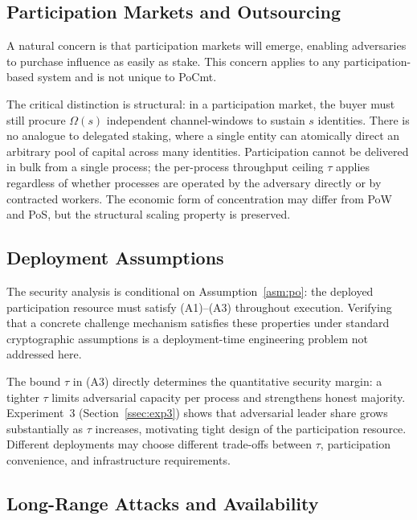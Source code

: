 \documentclass[10pt,journal,twoside]{IEEEtran}
\theoremstyle{remark}
\begin{document}
	\subsection{Participation Markets and Outsourcing}
	\label{ssec:disc-outsourcing}
	
	A natural concern is that participation markets will
	emerge, enabling adversaries to purchase influence as
	easily as stake.
	This concern applies to any participation-based system
	and is not unique to PoCmt.
	
	The critical distinction is structural: in a participation
	market, the buyer must still procure $\Omega(s)$
	independent channel-windows to sustain $s$ identities.
	There is no analogue to delegated staking, where a single
	entity can atomically direct an arbitrary pool of capital
	across many identities.
	Participation cannot be delivered in bulk from a single
	process; the per-process throughput ceiling $\tau$ applies
	regardless of whether processes are operated by the
	adversary directly or by contracted workers.
	The economic form of concentration may differ from PoW
	and PoS, but the structural scaling property is preserved.
	
	\subsection{Deployment Assumptions}
	\label{ssec:disc-po}
	
	The security analysis is conditional on
	Assumption~\ref{asm:po}: the deployed participation
	resource must satisfy (A1)--(A3) throughout execution.
	Verifying that a concrete challenge mechanism satisfies
	these properties under standard cryptographic assumptions
	is a deployment-time engineering problem not addressed
	here.
	
	The bound $\tau$ in (A3) directly determines the
	quantitative security margin: a tighter $\tau$ limits
	adversarial capacity per process and strengthens honest
	majority.
	Experiment~3 (Section~\ref{ssec:exp3}) shows that
	adversarial leader share grows substantially as $\tau$
	increases, motivating tight design of the participation
	resource.
	Different deployments may choose different trade-offs
	between $\tau$, participation convenience, and
	infrastructure requirements.
	
	\subsection{Long-Range Attacks and Availability}
	\label{ssec:disc-dynamic}
	
\end{document}
